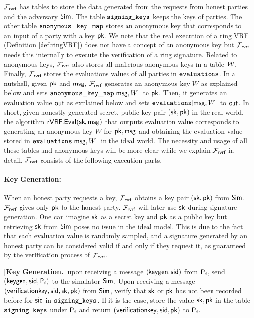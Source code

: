 $ \mathcal{F}_{\textsf{rvrf}} $ has tables to store the data generated from the requests from honest parties and the adversary $ \mathsf{Sim} $. The table $ \texttt{signing\_keys} $  keeps the keys of parties. The other table  $ \mathtt{anonymous\_key\_map} $ stores an anonymous key that corresponds to an input  of a party with a key $ \mathsf{pk} $. We note that the real execution of a ring VRF (Definition \ref{def:ringVRF}) does not have a concept of an anonymous key but $ \mathcal{F}_{\textsf{rvrf}} $ needs this internally to execute the verification of a ring signature. Related to anonymous keys, $ \mathcal{F}_{\textsf{rvrf}} $ also stores  all  malicious anonymous keys in a table $ \mathcal{W} $. Finally, $ \mathcal{F}_{\textsf{rvrf}} $ stores the evaluations values of all parties in $ \texttt{evaluations} $. In a nutshell,  given $ \mathsf{pk} $
and $ \mathsf{msg} $, $ \mathcal{F}_{\textsf{rvrf}} $  generates an anonymous key $ W $ as explained below and  sets $ \mathtt{anonymous\_key\_map}[\mathsf{msg},W]  $ to $ \mathsf{pk} $. Then, it generates an evaluation value $ {\mathsf{out}} $ as explained below and sets $ \texttt{evaluations}[\mathsf{msg},W]  $ to $ {\mathsf{out}} $. In short, given honestly generated secret, public key pair $ (\mathsf{sk},\mathsf{pk}) $ in the real world, the algorithm
$ {\mathsf{rVRF}}.{\mathsf{Eval}}(\mathsf{sk},\mathsf{msg}) $  that outputs evaluation value corresponds to generating an anonymous key $ W $ for $ \mathsf{pk}, \mathsf{msg} $ and obtaining the evaluation value stored in $ \texttt{evaluations}[\mathsf{msg},W] $ in the ideal world. The necessity and usage of all these tables and anonymous keys will be more clear while we explain $ \mathcal{F}_{\textsf{rvrf}} $ in detail. $ \mathcal{F}_{\textsf{rvrf}} $ consists of the following execution parts.



\paragraph{Key Generation:}  When an honest party requests  a key, $ \mathcal{F}_{\textsf{rvrf}} $ obtains a key pair $ (\mathsf{sk}, \mathsf{pk}) $ from $ \mathsf{Sim} $. $ \mathcal{F}_{\textsf{rvrf}} $ gives only $ \mathsf{pk} $ to the honest party. $ \mathcal{F}_{\textsf{rvrf}} $ will later use $ \mathsf{sk} $ during signature generation. One can imagine $ \mathsf{sk} $ as a secret key and $ \mathsf{pk} $ as a public key but retrieving $ \mathsf{sk} $ from $ \mathsf{Sim} $ poses no issue in the ideal model. This is due to the fact that each evaluation value is randomly sampled, and a signature generated by an honest party can be considered valid if and only if they request it, as guaranteed by the verification process of $\mathcal{F}_{\textsf{rvrf}}$.



\begin{tcolorbox}[left=2pt,right=2pt]
	\eprint{}{\scriptsize}
	\textbf{[Key Generation.]} upon receiving a message $(\mathsf{keygen}, \textsf{sid})$ from  $\mathsf{P}_i$, send $(\mathsf{keygen}, \textsf{sid}, \mathsf{P}_i)$ to the simulator $\mathsf{Sim}$.
	Upon receiving a message $(\mathsf{verificationkey}, \textsf{sid}, \mathsf{sk},\mathsf{pk})$ from $\mathsf{Sim}$, verify that $\mathsf{sk} $ or $\mathsf{pk}$ has not been recorded before for $ \textsf{sid} $ in $ \texttt{signing\_keys} $. If it is the case, store  the value $\mathsf{sk},\mathsf{pk}$ in the table $\texttt{signing\_keys}$ under $\mathsf{P}_i$ and return $(\mathsf{verificationkey}, \textsf{sid}, \mathsf{pk})$ to $ \mathsf{P}_i$.
\end{tcolorbox}


